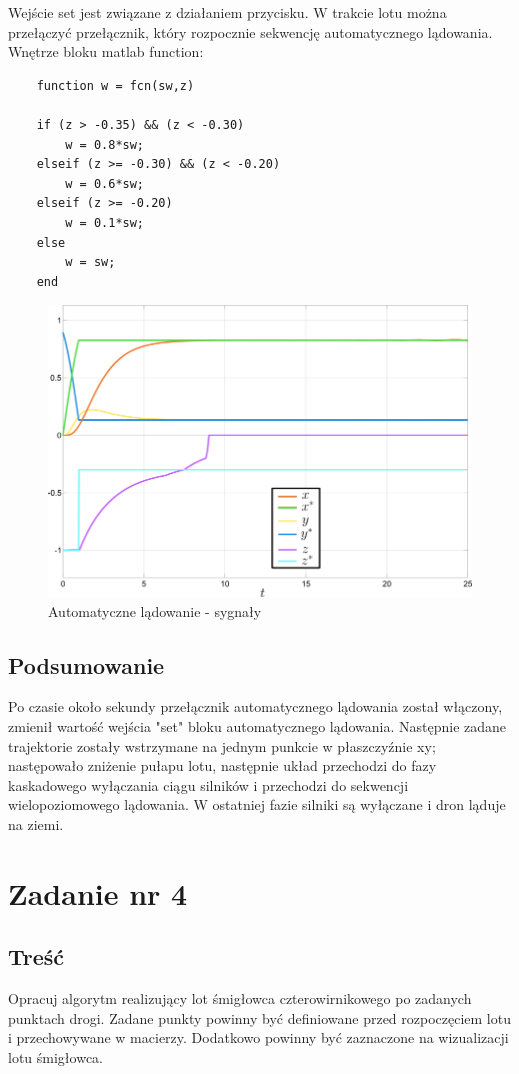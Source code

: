 \documentclass[polish,11pt,a4paper]{article}
\begin{document}
Wejście set jest związane z działaniem przycisku. W trakcie lotu można przełączyć przełącznik, który rozpocznie
sekwencję automatycznego lądowania. Wnętrze bloku matlab function:

\begin{verbatim}
    function w = fcn(sw,z)

    if (z > -0.35) && (z < -0.30)
        w = 0.8*sw;
    elseif (z >= -0.30) && (z < -0.20)
        w = 0.6*sw;
    elseif (z >= -0.20)
        w = 0.1*sw;
    else
        w = sw;
    end
\end{verbatim}
\break
\begin{figure}[h]
    \centering
    \includegraphics[width=0.65\linewidth]{lądowanie/land.png}
    \caption{Automatyczne lądowanie - sygnały}
    \label{fig:enter-label}

\end{figure}

\break
\subsection*{Podsumowanie}
Po czasie około sekundy przełącznik automatycznego lądowania został włączony, zmienił wartość wejścia "set" bloku automatycznego
lądowania. Następnie zadane trajektorie zostały wstrzymane na jednym punkcie w płaszczyźnie xy; następowało 
zniżenie pułapu lotu, następnie układ przechodzi do fazy kaskadowego wyłączania ciągu silników i przechodzi
do sekwencji wielopoziomowego lądowania. W ostatniej fazie silniki są wyłączane i dron ląduje na ziemi.

\section*{Zadanie nr 4}
\subsection*{Treść}
Opracuj algorytm realizujący lot śmigłowca czterowirnikowego po zadanych punktach drogi.
Zadane punkty powinny być definiowane przed rozpoczęciem lotu i przechowywane w 
macierzy. Dodatkowo powinny być zaznaczone na wizualizacji lotu śmigłowca.
\end{document}
